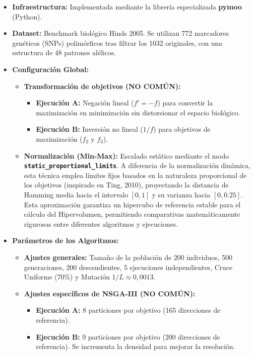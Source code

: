 \documentclass[a4paper,10pt]{article}
\begin{document}
\begin{itemize}
    \item \textbf{Infraestructura:} Implementada mediante la librería especializada \textbf{pymoo} (Python).
    \item \textbf{Dataset:} Benchmark biológico Hinds 2005. Se utilizan 772 marcadores genéticos (SNPs) polimórficos tras filtrar los 1032 originales, con una estructura de 48 patrones alélicos.
    \item \textbf{Configuración Global:}
    \begin{itemize}
        \item \textbf{Transformación de objetivos (NO COMÚN):} 
        \begin{itemize}
            \item \textbf{Ejecución A:} Negación lineal ($f' = -f$) para convertir la maximización en minimización sin distorsionar el espacio biológico.
            \item \textbf{Ejecución B:} Inversión no lineal ($1/f$) para objetivos de maximización ($f_2$ y $f_3$).
        \end{itemize}
        \item \textbf{Normalización (Min-Max):} Escalado estático mediante el modo \textbf{\texttt{static\_proportional\_limits}}. A diferencia de la normalización dinámica, esta técnica emplea límites fijos basados en la naturaleza proporcional de los objetivos (inspirado en Ting, 2010), proyectando la distancia de Hamming media hacia el intervalo $[0, 1]$ y su varianza hacia $[0, \mbox{0.25}]$. Esta aproximación garantiza un hipercubo de referencia estable para el cálculo del Hipervolumen, permitiendo comparativas matemáticamente rigurosas entre diferentes algoritmos y ejecuciones.
    \end{itemize}
    \item \textbf{Parámetros de los Algoritmos:}
    \begin{itemize}
        \item \textbf{Ajustes generales:} Tamaño de la población de 200 individuos, 500 generaciones, 200 descendientes, 5 ejecuciones independientes, Cruce Uniforme (70\%) y Mutación $1/L \approx 0,0013$.
        \item \textbf{Ajustes específicos de NSGA-III (NO COMÚN):}
        \begin{itemize}
            \item \textbf{Ejecución A:} 8 particiones por objetivo (165 direcciones de referencia).
            \item \textbf{Ejecución B:} 9 particiones por objetivo (200 direcciones de referencia). Se incrementa la densidad para mejorar la resolución.

\end{itemize}
\end{itemize}
\end{itemize}
\end{document}
